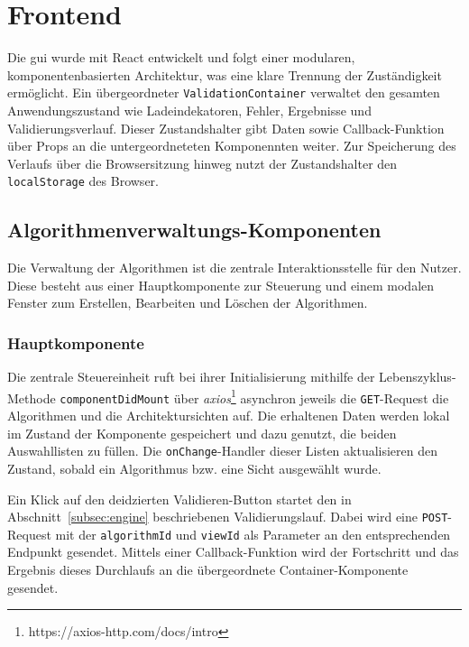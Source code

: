 \section{Frontend}
\label{sec:frontendimp}

Die \gls{gui} wurde mit React entwickelt und folgt einer modularen, komponentenbasierten Architektur, was eine klare Trennung der Zuständigkeit ermöglicht. Ein übergeordneter \texttt{ValidationContainer} verwaltet den gesamten Anwendungszustand wie Ladeindekatoren, Fehler, Ergebnisse und Validierungsverlauf. Dieser Zustandshalter gibt Daten sowie Callback-Funktion über Props an  die untergeordneteten Komponennten weiter. Zur Speicherung des Verlaufs über die Browsersitzung hinweg nutzt der Zustandshalter den \texttt{localStorage} des Browser.

\subsection{Algorithmenverwaltungs-Komponenten}
\label{subsec:verwaltung}

Die Verwaltung der Algorithmen ist die zentrale Interaktionsstelle für den Nutzer. Diese besteht aus einer Hauptkomponente zur Steuerung und einem modalen Fenster zum Erstellen, Bearbeiten und Löschen der Algorithmen.

\subsubsection*{Hauptkomponente}

Die zentrale Steuereinheit ruft bei ihrer Initialisierung mithilfe der Lebenszyklus-Methode \texttt{componentDidMount} über \textit{axios}\footnote{https://axios-http.com/docs/intro} asynchron jeweils die \texttt{GET}-Request die Algorithmen und die Architektursichten auf. Die erhaltenen Daten werden lokal im Zustand der Komponente gespeichert und dazu genutzt, die beiden Auswahllisten zu füllen. Die \texttt{onChange}-Handler dieser Listen aktualisieren den Zustand, sobald ein Algorithmus bzw. eine Sicht ausgewählt wurde.

Ein Klick auf den deidzierten \glqq Validieren\grqq{}-Button startet den in Abschnitt~\ref{subsec:engine} beschriebenen Validierungslauf. Dabei wird eine \texttt{POST}-Request mit der \texttt{algorithmId} und \texttt{viewId} als Parameter an den entsprechenden Endpunkt gesendet. Mittels einer Callback-Funktion wird der Fortschritt und das Ergebnis dieses Durchlaufs an die übergeordnete Container-Komponente gesendet.

